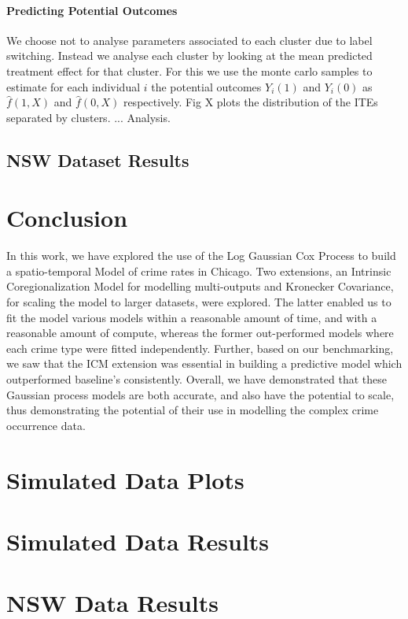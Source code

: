 \documentclass{article}
\begin{document}
\paragraph{Predicting Potential Outcomes} We choose not to analyse parameters associated to each cluster due to label switching. Instead we analyse each cluster by looking at the mean predicted treatment effect for that cluster. For this we use the monte carlo samples to estimate for each individual $i$ the potential outcomes $Y_i(1)$ and $Y_i(0)$ as $\hat{f}(1,X)$ and $\hat{f}(0,X)$ respectively. Fig X plots the distribution of the ITEs separated by clusters. ... Analysis.

\subsection{NSW Dataset Results} 




\section{Conclusion}
In this work, we have explored the use of the Log Gaussian Cox Process to build a spatio-temporal Model of crime rates in Chicago. Two extensions, an Intrinsic Coregionalization Model for modelling multi-outputs and Kronecker Covariance, for scaling the model to larger datasets, were explored. The latter enabled us to fit the model various models within a reasonable amount of time, and with a reasonable amount of compute, whereas the former out-performed models where each crime type were fitted independently. Further, based on our benchmarking, we saw that the ICM extension was essential in building a predictive model which outperformed baseline's consistently. Overall, we have demonstrated that these Gaussian process models are both accurate, and also have the potential to scale, thus demonstrating the potential of their use in modelling the complex crime occurrence data. 




\appendix

\section{Simulated Data Plots}

\section{Simulated Data Results}

\section{NSW Data Results}

\printbibliography
\end{document}
